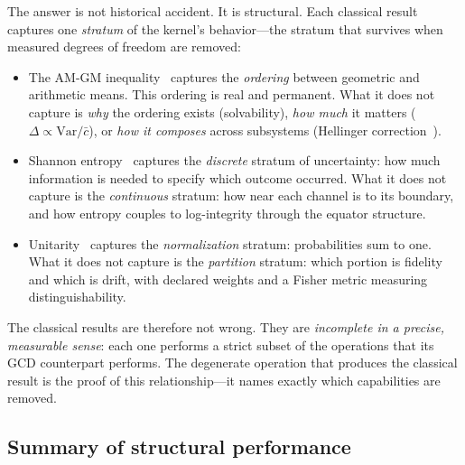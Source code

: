 \documentclass[
  aps,
  prd,
  twocolumn,
  superscriptaddress,
  nofootinbib,
  floatfix
]{revtex4-2}
\begin{document}
The answer is not historical accident.  It is structural.
Each classical result captures one \emph{stratum} of the
kernel's behavior---the stratum that survives when
measured degrees of freedom are removed:

\begin{itemize}[leftmargin=*]
\item The AM-GM inequality~\cite{hardylittlewoodpolya1952}
  captures the \emph{ordering} between geometric and arithmetic
  means.  This ordering is real and permanent.  What it does not
  capture is \emph{why} the ordering exists (solvability),
  \emph{how much} it matters
  ($\Delta \propto \mathrm{Var}/\bar{c}$), or \emph{how it
  composes} across subsystems
  (Hellinger correction~\cite{hellinger1909}).

\item Shannon entropy~\cite{shannon1948} captures the
  \emph{discrete} stratum of uncertainty: how much information
  is needed to specify which outcome occurred.  What it does not
  capture is the \emph{continuous} stratum: how near each channel is to
  its boundary, and how entropy couples to log-integrity
  through the equator structure.

\item Unitarity~\cite{weinberg1995qft1} captures the
  \emph{normalization} stratum: probabilities sum to one.
  What it does not capture is the \emph{partition} stratum: which portion is fidelity
  and which is drift, with declared weights and a Fisher
  metric measuring distinguishability.
\end{itemize}

The classical results are therefore not wrong.  They are
\emph{incomplete in a precise, measurable sense}: each one
performs a strict subset of the operations that its GCD
counterpart performs.  The degenerate operation that
produces the classical result is the proof of this
relationship---it names exactly which capabilities are
removed.

\subsection{Summary of structural performance}
\end{document}
